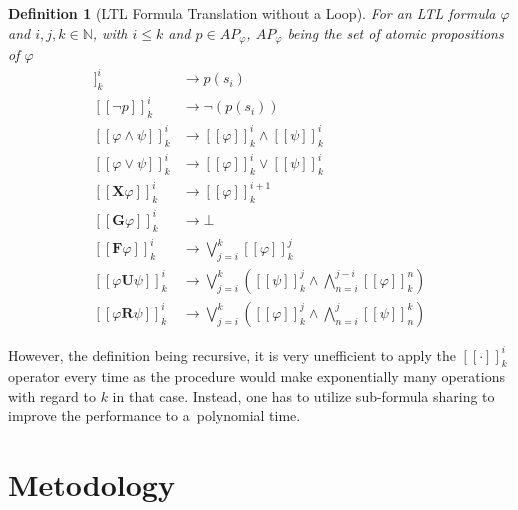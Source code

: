 \documentclass[12pt,oneside,draft]{fithesis}
\newcommand{\mNatural}{\mathbb{N}}
\newcommand{\bF}{\mathbf{F}}
\newcommand{\bG}{\mathbf{G}}
\newcommand{\bX}{\mathbf{X}}
\newcommand{\bU}{\mathbf{U}}
\newcommand{\bR}{\mathbf{R}}
\newtheorem{mydef}{Definition}
\begin{document}
\begin{mydef}[LTL Formula Translation without a Loop]
For an LTL formula $\varphi$ and $i,j,k\in\mNatural$, with $i\leq k$ and
$p\in {AP}_\varphi$, ${AP}_\varphi$ being the set of atomic propositions
of $\varphi$
\begin{align}
	[[p]]_k^i&\rightarrow p(s_i)\\
	[[\neg p]]_k^i&\rightarrow\neg(p(s_i))\\
	[[\varphi\wedge\psi]]_k^i&\rightarrow
		[[\varphi]]_k^i\wedge[[\psi]]_k^i\\
	[[\varphi\vee\psi]]_k^i&\rightarrow
		[[\varphi]]_k^i\vee[[\psi]]_k^i\\
	[[\bX\varphi]]_k^i&\rightarrow[[\varphi]]_k^{i+1}\\
	[[\bG\varphi]]_k^i&\rightarrow\bot\\
	[[\bF\varphi]]_k^i&\rightarrow\bigvee_{j=i}^k[[\varphi]]_k^j\\
	[[\varphi\bU\psi]]_k^i&\rightarrow\bigvee_{j=i}^k\left(
		[[\psi]]_k^j\wedge\bigwedge_{n=i}^{j-i}[[\varphi]]_k^n
	\right)\\
	[[\varphi\bR\psi]]_k^i&\rightarrow\bigvee_{j=i}^k\left(
		[[\varphi]]_k^j\wedge\bigwedge_{n=i}^j[[\psi]]_n^k
	\right)
\end{align} 
\end{mydef}
However, the definition being recursive, it is very unefficient to
apply the $[[\cdot]]_k^i$ operator every time as the procedure would
make exponentially many operations with regard to $k$ in that case.
Instead, one has to utilize sub-formula sharing to improve the
performance to a~polynomial time\cite{biere}.

\chapter{Metodology}
\end{document}
